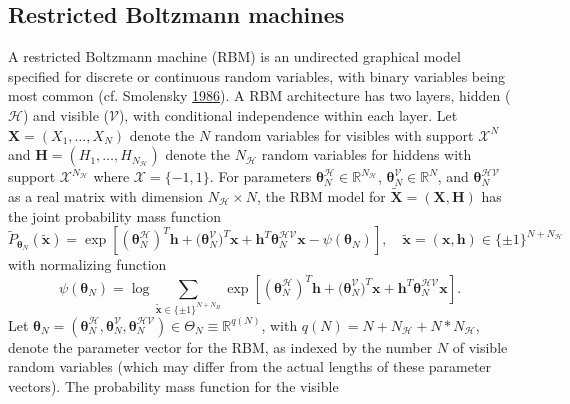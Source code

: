 \documentclass[12pt]{article}
\theoremstyle{definition}
\begin{document}
\subsection{Restricted Boltzmann
machines}\label{restricted-boltzmann-machines}

A restricted Boltzmann machine (RBM) is an undirected graphical model
specified for discrete or continuous random variables, with binary
variables being most common (cf. Smolensky
\protect\hyperlink{ref-smolensky1986information}{1986}). A RBM
architecture has two layers, hidden (\(\mathcal{H}\)) and visible
(\(\mathcal{V}\)), with conditional independence within each layer. Let
\(\boldsymbol X = (X_1,\ldots,X_N)\) denote the \(N\) random variables
for visibles with support \(\mathcal{X}^N\) and
\(\boldsymbol H = (H_1,\ldots,H_{N_\mathcal{H}})\) denote the
\(N_\mathcal{H}\) random variables for hiddens with support
\(\mathcal{X}^{N_\mathcal{H}}\) where \(\mathcal{X} = \{-1,1\}\). For
parameters
\(\boldsymbol \theta_N^{\mathcal{H}} \in \mathbb{R}^{N_\mathcal{H}}\),
\(\boldsymbol \theta_N^{\mathcal{V}}\in \mathbb{R}^N\), and
\(\boldsymbol \theta_N^{\mathcal{HV}}\) as a real matrix with dimension
\(N_\mathcal{H} \times N\), the RBM model for
\(\tilde{\boldsymbol X}=(\boldsymbol X,\boldsymbol H)\) has the joint
probability mass function
\begin{equation}
\label{eq:RBM1}
\tilde{P}_{\boldsymbol \theta_N} (\tilde{\boldsymbol x}) = \exp\left[ (\boldsymbol \theta_N^{\mathcal{H}})^T \boldsymbol h + \boldsymbol (\boldsymbol \theta_N^{\mathcal{V}})^T \boldsymbol x + \boldsymbol h^T  \boldsymbol\theta_N^{\mathcal{HV}} \boldsymbol x - \psi(\boldsymbol \theta_N)\right], \quad \tilde{\boldsymbol x} = (\boldsymbol x, \boldsymbol h) \in \{\pm 1\}^{N+N_\mathcal{H}}
\end{equation}
with normalizing function \[
\psi(\boldsymbol \theta_N) = \log \sum_{\tilde{\boldsymbol x} \in \{\pm 1\}^{N+N_H} } \exp\left[ (\boldsymbol \theta_N^{\mathcal{H}})^T \boldsymbol h + \boldsymbol (\boldsymbol \theta_N^{\mathcal{V}})^T \boldsymbol x + \boldsymbol h^T  \boldsymbol\theta_N^{\mathcal{HV}} \boldsymbol x\right].
\] Let
\(\boldsymbol \theta_N = (\boldsymbol \theta_N^{\mathcal{H}}, \boldsymbol \theta_N^{\mathcal{V}}, \boldsymbol\theta_N^{\mathcal{HV}} ) \in \Theta_N \equiv \mathbb{R}^{q(N)}\),
with \(q(N) = N + N_\mathcal{H} + N*N_\mathcal{H}\), denote the
parameter vector for the RBM, as indexed by the number \(N\) of visible
random variables (which may differ from the actual lengths of these
parameter vectors). The probability mass function for the visible
\end{document}

